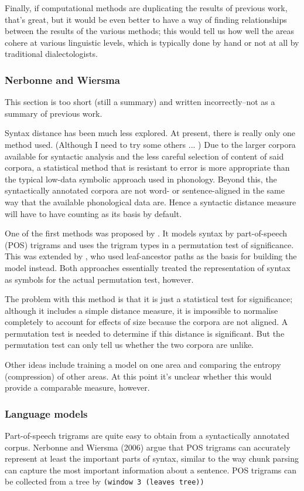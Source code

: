 \documentclass[11pt]{article}
\begin{document}
Finally, if computational methods are duplicating the results of
previous work, that's great, but it would be even better to have a
way of finding relationships between
the results of the various methods; this would tell us how well the
areas cohere at various linguistic levels, which is typically done by
hand or not at all by traditional dialectologists.

\subsubsection{Nerbonne and Wiersma}
This section is too short (still a summary) and written
incorrectly--not as a summary of previous work.

Syntax distance has been much less explored. At present, there is
really only one method used. (Although I need to try some others ... )
Due to the larger corpora available for syntactic analysis and the
less careful selection of content of said corpora, a statistical
method that is resistant to error is more appropriate than the typical
low-data symbolic approach used in phonology. Beyond this, the
syntactically annotated corpora are not word- or sentence-aligned in
the same way that the available phonological data are. Hence a
syntactic distance measure will have to have counting as its basis by
default.

One of the first methods was proposed by .
It models syntax by part-of-speech (POS) trigrams and
uses the trigram types in a permutation test of significance. This was
extended by , who used  leaf-ancestor
paths as the basis for building the model instead. Both approaches
essentially treated the representation of syntax as symbols for the
actual permutation test, however.

The problem with this method is that it is just a statistical test for
significance; although it includes a simple distance measure, it is
impossible to normalise completely to account for effects of size
because the corpora are not aligned. A permutation test is needed to
determine if this distance is significant. But the permutation test
can only tell us whether the two corpora are unlike.

Other ideas include training a
model on one area and comparing the entropy (compression) of other
areas. At this point it's unclear whether this would provide a
comparable measure, however.

\subsubsection{Language models}
Part-of-speech trigrams are quite easy to obtain from a syntactically
annotated corpus. Nerbonne and Wiersma (2006) argue that POS trigrams
can accurately represent at least the important parts of syntax,
similar to the way chunk parsing can capture the most important
information about a sentence. POS
trigrams can be collected from a tree by
\verb+(window 3 (leaves tree))+
\end{document}
